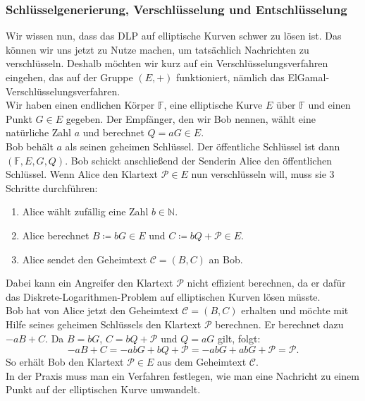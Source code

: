 \documentclass[hidelinks]{article}
\theoremstyle{plain}
\theoremstyle{definition}
\theoremstyle{rem}
\begin{document}
\begin{sloppypar}
\subsubsection{Schlüsselgenerierung, Verschlüsselung und Entschlüsselung}
Wir wissen nun, dass das DLP auf elliptische Kurven schwer zu lösen ist. Das können wir uns jetzt zu Nutze machen, um tatsächlich Nachrichten zu verschlüsseln. Deshalb möchten wir kurz auf ein Verschlüsselungsverfahren eingehen, das auf der Gruppe $(E, +)$ funktioniert, nämlich das ElGamal-Verschlüsselungsverfahren.\\
\newline
Wir haben einen endlichen Körper $\mathbb{F}$, eine elliptische Kurve $E$ über $\mathbb{F}$ und einen Punkt $G \in E$ gegeben. Der Empfänger, den wir Bob nennen, wählt eine natürliche Zahl $a$ und berechnet $Q = aG \in E$. \\
Bob behält $a$ als seinen geheimen Schlüssel. Der öffentliche Schlüssel ist dann $(\mathbb{F}, E, G, Q)$. Bob schickt anschließend der Senderin Alice den öffentlichen Schlüssel. Wenn Alice den Klartext $\mathcal{P} \in E$ nun verschlüsseln will, muss sie 3 Schritte durchführen:
\begin{enumerate}
    \item Alice wählt zufällig eine Zahl $b \in \mathbb{N}$.
    \item Alice berechnet $B \coloneqq bG \in E$ und $C \coloneqq bQ + \mathcal{P} \in E$.
    \item Alice sendet den Geheimtext $\mathcal{C} = (B,C)$ an Bob.
\end{enumerate}
Dabei kann ein Angreifer den Klartext $\mathcal{P}$ nicht effizient berechnen, da er dafür das Diskrete-Logarithmen-Problem auf elliptischen Kurven lösen müsste. \\
\newline
Bob hat von Alice jetzt den Geheimtext $\mathcal{C} = (B,C)$ erhalten und möchte mit Hilfe seines geheimen Schlüssels den Klartext $\mathcal{P}$ berechnen. Er berechnet dazu $-aB + C$. 
Da $B=bG$, $C=bQ + \mathcal{P}$ und $Q = aG$ gilt, folgt:
\begin{equation*}
    -aB + C = -abG + bQ + \mathcal{P} = -abG + abG + \mathcal{P} = \mathcal{P}.
\end{equation*}
So erhält Bob den Klartext $\mathcal{P} \in E$ aus dem Geheimtext $\mathcal{C}$.\\In der Praxis muss man ein Verfahren festlegen, wie man eine Nachricht zu einem Punkt auf der elliptischen Kurve umwandelt.

\end{sloppypar}
\end{document}

